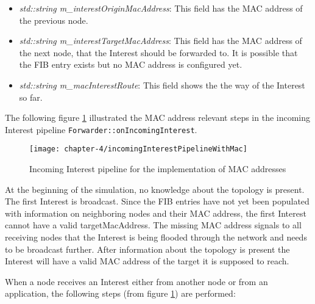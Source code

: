 \clearpage

\begin{itemize}
\item \emph{std::string m\_interestOriginMacAddress}: This field has the MAC address of the previous node.
\item \emph{std::string m\_interestTargetMacAddress}: This field has the MAC address of the next node, that the Interest should be forwarded to. It is possible that the FIB entry exists but no MAC address is configured yet.
\item \emph{std::string m\_macInterestRoute}: This field shows the the way of the Interest so far.
\end{itemize}

The following figure \ref{fig:incomingInterestPipelineWithMac} illustrated the MAC address relevant steps in the incoming Interest pipeline \texttt{Forwarder::onIncomingInterest}.

\vspace{5mm} %

\begin{figure}[H]
  \centering
  \texttt{[image: chapter-4/incomingInterestPipelineWithMac]}
  \caption{Incoming Interest pipeline for the implementation of MAC addresses}
  \label{fig:incomingInterestPipelineWithMac}
\end{figure}

\vspace{5mm} %

At the beginning of the simulation, no knowledge about the topology is present. The first Interest is broadcast. Since the FIB entries have not yet been populated with information on neighboring nodes and their MAC address, the first Interest cannot have a valid targetMacAddress. The missing MAC address signals to all receiving nodes that the Interest is being flooded through the network and needs to be broadcast further. After information about the topology is present the Interest will have a valid MAC address of the target it is supposed to reach.

When a node receives an Interest either from another node or from an application, the following steps (from figure \ref{fig:incomingInterestPipelineWithMac}) are performed:

